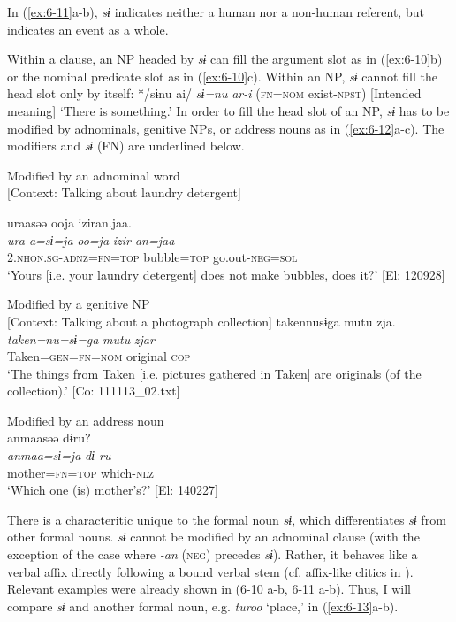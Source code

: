 In (\ref{ex:6-11}a-b), \textit{sɨ} indicates neither a human nor a non-human referent, but indicates an event as a whole.

  Within a clause, an NP headed by \textit{sɨ} can fill the argument slot as in (\ref{ex:6-10}b) or the nominal predicate slot as in (\ref{ex:6-10}c). Within an NP, \textit{sɨ} cannot fill the head slot only by itself: */sɨnu ai/ \textit{sɨ=nu} \textit{ar-i} (\textsc{fn}=\textsc{nom} exist-\textsc{npst}) [Intended meaning] ‘There is something.’ In order to fill the head slot of an NP, \textit{sɨ} has to be modified by adnominals, genitive NPs, or address nouns as in (\ref{ex:6-12}a-c). The modifiers and \textit{sɨ} (FN) are underlined below.

\ea\label{ex:6-12}
\ea Modified by an adnominal word\\{}
[Context: Talking about laundry detergent]

{\TM}
\glll uraasəə  ooja  iziran.jaa.\\
      \textit{ura-a=sɨ=ja}  \textit{oo=ja}  \textit{izir-an=jaa}\\
      2.\textsc{nhon}.\textsc{sg}-\textsc{adnz}=\textsc{fn}=\textsc{top}  bubble=\textsc{top}  go.out-\textsc{neg}=\textsc{sol}\\
\glt ‘Yours [i.e. your laundry detergent] does not make bubbles, does it?’ [El: 120928]

\ex Modified by a genitive NP\\{}
[Context: Talking about a photograph collection]
{\TM}
\glll {\textbar}taken{\textbar}nusɨga  mutu  zja.\\
      \textit{taken=nu=sɨ=ga}  \textit{mutu}  \textit{zjar}\\
      Taken=\textsc{gen}=\textsc{fn}=\textsc{nom}  original  \textsc{cop}\\
\glt ‘The things from Taken [i.e. pictures gathered in Taken] are originals (of the collection).’ [Co: 111113\_02.txt]

\ex Modified by an address noun\\
{\TM}
\glll  anmaasəə  dɨru?\\
\textit{anmaa=sɨ=ja}  \textit{dɨ-ru}\\
mother=\textsc{fn}=\textsc{top}  which-\textsc{nlz}\\
\glt ‘Which one (is) mother’s?’ [El: 140227]
\z
\z

There is a characteritic unique to the formal noun \textit{sɨ}, which differentiates \textit{sɨ} from other formal nouns. \textit{sɨ} cannot be modified by an adnominal clause (with the exception of the case where \textit{-an} (\textsc{neg}) precedes \textit{sɨ}). Rather, it behaves like a verbal affix directly following a bound verbal stem (cf. affix-like clitics in ). Relevant examples were already shown in (6-10 a-b, 6-11 a-b). Thus, I will compare \textit{sɨ} and another formal noun, e.g. \textit{turoo} ‘place,’ in (\ref{ex:6-13}a-b).


